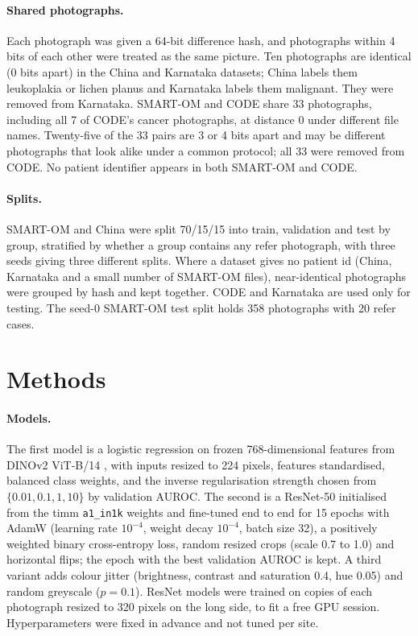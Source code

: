 \documentclass[11pt]{article}
\begin{document}
\paragraph{Shared photographs.} Each photograph was given a 64-bit difference hash, and photographs within 4 bits of each other were treated as the same picture. Ten photographs are identical (0 bits apart) in the China and Karnataka datasets; China labels them leukoplakia or lichen planus and Karnataka labels them malignant. They were removed from Karnataka. SMART-OM and CODE share 33 photographs, including all 7 of CODE's cancer photographs, at distance 0 under different file names. Twenty-five of the 33 pairs are 3 or 4 bits apart and may be different photographs that look alike under a common protocol; all 33 were removed from CODE. No patient identifier appears in both SMART-OM and CODE.

\paragraph{Splits.} SMART-OM and China were split 70/15/15 into train, validation and test by group, stratified by whether a group contains any refer photograph, with three seeds giving three different splits. Where a dataset gives no patient id (China, Karnataka and a small number of SMART-OM files), near-identical photographs were grouped by hash and kept together. CODE and Karnataka are used only for testing. The seed-0 SMART-OM test split holds 358 photographs with 20 refer cases.

\section{Methods}

\paragraph{Models.} The first model is a logistic regression on frozen 768-dimensional features from DINOv2 ViT-B/14 \citep{oquab2023dinov2}, with inputs resized to 224 pixels, features standardised, balanced class weights, and the inverse regularisation strength chosen from $\{0.01, 0.1, 1, 10\}$ by validation AUROC. The second is a ResNet-50 \citep{he2016resnet} initialised from the timm \texttt{a1\_in1k} weights \citep{wightman2021resnet} and fine-tuned end to end for 15 epochs with AdamW (learning rate $10^{-4}$, weight decay $10^{-4}$, batch size 32), a positively weighted binary cross-entropy loss, random resized crops (scale 0.7 to 1.0) and horizontal flips; the epoch with the best validation AUROC is kept. A third variant adds colour jitter (brightness, contrast and saturation 0.4, hue 0.05) and random greyscale ($p=0.1$). ResNet models were trained on copies of each photograph resized to 320 pixels on the long side, to fit a free GPU session. Hyperparameters were fixed in advance and not tuned per site.
\end{document}
